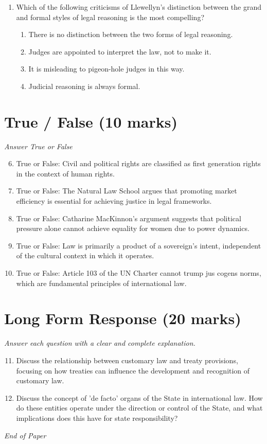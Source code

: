 \documentclass[12pt]{article}
\begin{document}
\begin{enumerate}[label=\arabic*.]
\begin{enumerate}[label=(\alph*)]
    \item Austin
\end{enumerate}
\item Which of the following criticisms of Llewellyn's distinction between the grand and formal styles of legal reasoning is the most compelling?
\begin{enumerate}[label=(\alph*)]
    \item There is no distinction between the two forms of legal reasoning.
    \item Judges are appointed to interpret the law, not to make it.
    \item It is misleading to pigeon-hole judges in this way.
    \item Judicial reasoning is always formal.
\end{enumerate}
\end{enumerate}

\section*{True / False (10 marks)}
\textit{Answer True or False}
\begin{enumerate}[label=\arabic*.]
\setcounter{enumi}{5}
\item True or False: Civil and political rights are classified as first generation rights in the context of human rights.
\item True or False: The Natural Law School argues that promoting market efficiency is essential for achieving justice in legal frameworks.
\item True or False: Catharine MacKinnon's argument suggests that political pressure alone cannot achieve equality for women due to power dynamics.
\item True or False: Law is primarily a product of a sovereign's intent, independent of the cultural context in which it operates.
\item True or False: Article 103 of the UN Charter cannot trump jus cogens norms, which are fundamental principles of international law.
\end{enumerate}

\section*{Long Form Response (20 marks)}
\textit{Answer each question with a clear and complete explanation.}
\begin{enumerate}[label=\arabic*.]
\setcounter{enumi}{10}
\item Discuss the relationship between customary law and treaty provisions, focusing on how treaties can influence the development and recognition of customary law.
\item Discuss the concept of 'de facto' organs of the State in international law. How do these entities operate under the direction or control of the State, and what implications does this have for state responsibility?
\end{enumerate}

\vfill
\noindent\textit{End of Paper}
\end{document}
